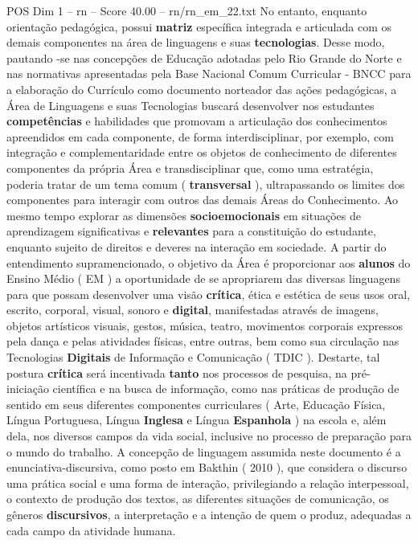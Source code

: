 \begin{textsample}{POS Dim 1 – rn – Score 40.00 – rn/rn\_em\_22.txt}
No entanto, enquanto orientação pedagógica, possui \textbf{matriz} específica integrada e articulada com os demais componentes na área de linguagens e suas \textbf{tecnologias}.
Desse modo, pautando -se nas concepções de Educação adotadas pelo Rio Grande do Norte e nas normativas apresentadas pela Base Nacional Comum Curricular - BNCC para a elaboração do Currículo como documento norteador das ações pedagógicas, a Área de Linguagens e suas Tecnologias buscará desenvolver nos estudantes \textbf{competências} e habilidades que promovam a articulação dos conhecimentos apreendidos em cada componente, de forma interdisciplinar, por exemplo, com integração e complementaridade entre os objetos de conhecimento de diferentes componentes da própria Área e transdisciplinar que, como uma estratégia, poderia tratar de um tema comum ( \textbf{transversal} ), ultrapassando os limites dos componentes para interagir com outros das demais Áreas do Conhecimento.
Ao mesmo tempo explorar as dimensões \textbf{socioemocionais} em situações de aprendizagem significativas e \textbf{relevantes} para a constituição do estudante, enquanto sujeito de direitos e deveres na interação em sociedade.
A partir do entendimento supramencionado, o objetivo da Área é proporcionar aos \textbf{alunos} do Ensino Médio ( EM ) a oportunidade de se apropriarem das diversas linguagens para que possam desenvolver uma visão \textbf{crítica}, ética e estética de seus usos oral, escrito, corporal, visual, sonoro e \textbf{digital}, manifestadas através de imagens, objetos artísticos visuais, gestos, música, teatro, movimentos corporais expressos pela dança e pelas atividades físicas, entre outras, bem como sua circulação nas Tecnologias \textbf{Digitais} de Informação e Comunicação ( TDIC ).
Destarte, tal postura \textbf{crítica} será incentivada \textbf{tanto} nos processos de pesquisa, na pré-iniciação científica e na busca de informação, como nas práticas de produção de sentido em seus diferentes componentes curriculares ( Arte, Educação Física, Língua Portuguesa, Língua \textbf{Inglesa} e Língua \textbf{Espanhola} ) na escola e, além dela, nos diversos campos da vida social, inclusive no processo de preparação para o mundo do trabalho.
A concepção de linguagem assumida neste documento é a enunciativa-discursiva, como posto em Bakthin ( 2010 ), que considera o discurso uma prática social e uma forma de interação, privilegiando a relação interpessoal, o contexto de produção dos textos, as diferentes situações de comunicação, os gêneros \textbf{discursivos}, a interpretação e a intenção de quem o produz, adequadas a cada campo da atividade humana.

\end{textsample}
